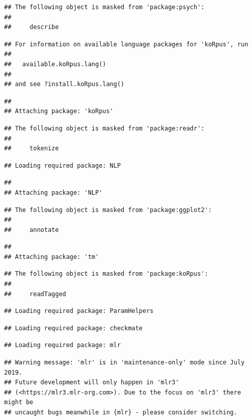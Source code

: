\documentclass[
]{article}
\begin{document}
\begin{verbatim}
## The following object is masked from 'package:psych':
## 
##     describe
\end{verbatim}

\begin{verbatim}
## For information on available language packages for 'koRpus', run
## 
##   available.koRpus.lang()
## 
## and see ?install.koRpus.lang()
\end{verbatim}

\begin{verbatim}
## 
## Attaching package: 'koRpus'
\end{verbatim}

\begin{verbatim}
## The following object is masked from 'package:readr':
## 
##     tokenize
\end{verbatim}

\begin{verbatim}
## Loading required package: NLP
\end{verbatim}

\begin{verbatim}
## 
## Attaching package: 'NLP'
\end{verbatim}

\begin{verbatim}
## The following object is masked from 'package:ggplot2':
## 
##     annotate
\end{verbatim}

\begin{verbatim}
## 
## Attaching package: 'tm'
\end{verbatim}

\begin{verbatim}
## The following object is masked from 'package:koRpus':
## 
##     readTagged
\end{verbatim}

\begin{verbatim}
## Loading required package: ParamHelpers
\end{verbatim}

\begin{verbatim}
## Loading required package: checkmate
\end{verbatim}

\begin{verbatim}
## Loading required package: mlr
\end{verbatim}

\begin{verbatim}
## Warning message: 'mlr' is in 'maintenance-only' mode since July 2019.
## Future development will only happen in 'mlr3'
## (<https://mlr3.mlr-org.com>). Due to the focus on 'mlr3' there might be
## uncaught bugs meanwhile in {mlr} - please consider switching.
\end{verbatim}
\end{document}
